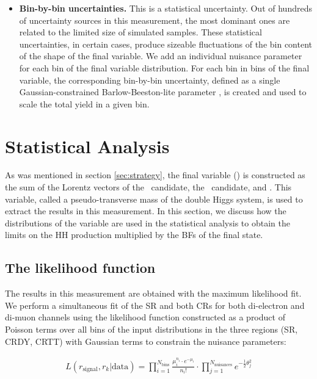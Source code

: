 \begin{small}
\begin{itemize}
\item{\bf Bin-by-bin uncertainties.} 
This is a statistical uncertainty. Out of hundreds of uncertainty sources in this measurement, the most dominant ones are related to the limited size of simulated samples. These statistical uncertainties, in certain cases, produce sizeable fluctuations of the bin content of the shape of the final variable. We add an individual nuisance parameter for each bin of the final variable distribution. For each bin in bins of the final variable, the corresponding bin-by-bin uncertainty, defined as a single Gaussian-constrained Barlow-Beeston-lite parameter \cite{Barlow-Beeston, autoMCStats}, is created and used to scale the total yield in a given bin.

\end{itemize}

\section{Statistical Analysis}
\label{sec:statistics}

As was mentioned in section \ref{sec:strategy}, the final variable (\mTHH) is constructed as the sum of the Lorentz vectors of the \Zll ~candidate, the \HBB~candidate, and \PTslash. This variable, called a pseudo-transverse mass of the double Higgs system, is used to extract the results in this measurement. In this section, we discuss how the distributions of the \mTHH variable are used in the statistical analysis to obtain the limits on the HH production multiplied by the BFs of the final state.

\subsection{The likelihood function}
\label{sec:likelihood}

The results in this measurement are obtained with the maximum likelihood fit. We perform a simultaneous fit of the SR and both CRs for both di-electron and di-muon channels using the likelihood function constructed as a product of Poisson terms over all bins of the input \mTHH distributions in the three regions (SR, CRDY, CRTT) with Gaussian terms to constrain the nuisance parameters:

\begin{align*}
 L(r_{\text{signal}}, r_{k}|\text{data}) = \prod_{i=1}^{N_{\mathrm{bins}}}\frac{\mu_{i}^{n_{i}}\cdot e^{-\mu_{i}}}{n_{i}!}
\cdot \prod_{j=1}^{N_{\mathrm{nuisances}}} e^{-\frac{1}{2}\theta_{j}^{2}}
\end{align*}


\end{small}
